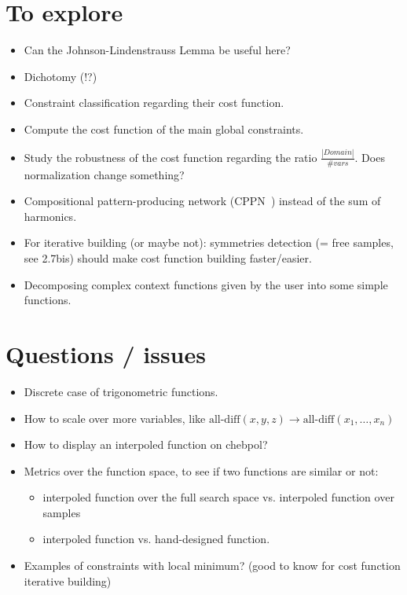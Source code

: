 \documentclass[a4paper, 12pt]{article}
\begin{document}
\section{To explore}
\begin{itemize}
\item Can the Johnson-Lindenstrauss Lemma be useful here?
\item Dichotomy (!?)
\item Constraint classification regarding their cost function.
\item Compute the cost function of the main global constraints.
\item Study the robustness of the cost function regarding the ratio $\frac{|Domain|}{\# vars}$. Does normalization change something?
\item   Compositional  pattern-producing   network  (CPPN~\cite{CPPN})
  instead of the sum of harmonics.
\item For iterative  building (or maybe not):  symmetries detection (=
  free  samples,  see  2.7bis)  should  make  cost  function  building
  faster/easier.
\item Decomposing  complex context  functions given  by the  user into
  some simple functions.
\end{itemize}

\section{Questions / issues}
\begin{itemize}
\item Discrete case of trigonometric functions.
\item How to scale over more variables, like $\text{all-diff}(x, y, z)
  \rightarrow \text{all-diff}(x_1, \ldots, x_n)$
\item How to display an interpoled function on chebpol?
\item Metrics  over the function  space, to  see if two  functions are
  similar or not:
  \begin{itemize}
  \item interpoled function over the  full search space vs. interpoled
    function over samples
  \item interpoled function vs. hand-designed function.
  \end{itemize}
\item Examples of constraints with local minimum? (good to know for cost function iterative building)
\end{itemize}




\end{document}
